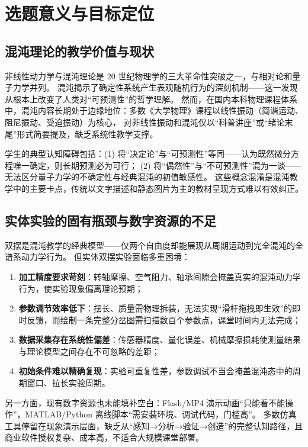 \section{选题意义与目标定位}

\subsection{混沌理论的教学价值与现状}

非线性动力学与混沌理论是 20 世纪物理学的三大革命性突破之一，与相对论和量子力学并列。
混沌揭示了确定性系统产生表观随机行为的深刻机制——这一发现从根本上改变了人类对“可预测性”的哲学理解。
然而，在国内本科物理课程体系中，混沌内容长期处于边缘地位：多数《大学物理》课程以线性振动（简谐运动、阻尼振动、受迫振动）为核心，
对非线性振动和混沌仅以“科普讲座”或“绪论末尾”形式简要提及，缺乏系统性教学支撑。

学生的典型认知障碍包括：(1) 将“决定论”与“可预测性”等同——认为既然微分方程唯一确定，则长期预测必为可行；
(2) 将“偶然性”与“不可预测性”混为一谈——无法区分量子力学的不确定性与经典混沌的初值敏感性。
这些概念混淆是混沌教学中的主要卡点，传统以文字描述和静态图片为主的教材呈现方式难以有效纠正。

\subsection{实体实验的固有瓶颈与数字资源的不足}

双摆是混沌教学的经典模型——仅两个自由度却能展现从周期运动到完全混沌的全谱系动力学行为。
但实体双摆实验面临多重困境：

\begin{enumerate}[label=(\arabic*), leftmargin=*]
  \item \textbf{加工精度要求苛刻}：转轴摩擦、空气阻力、轴承间隙会掩盖真实的混沌动力学行为，使实验现象偏离理论预期；
  \item \textbf{参数调节效率低下}：摆长、质量需物理拆装，无法实现“滑杆拖拽即生效”的即时反馈，而绘制一条完整分岔图需扫描数百个参数点，课堂时间内无法完成；
  \item \textbf{数据采集存在系统性偏差}：传感器精度、量化误差、机械摩擦损耗使测量结果与理论模型之间存在不可忽略的差距；
  \item \textbf{初始条件难以精确复现}：实验可重复性差，参数调试不当会掩盖混沌态中的周期窗口、拉长实验周期。
\end{enumerate}

另一方面，现有数字资源也未能填补空白：Flash/MP4 演示动画“只能看不能操作”，MATLAB/Python 离线脚本“需安装环境、调试代码，门槛高”。
多数仿真工具停留在现象演示层面，缺乏从“感知→分析→验证→创造”的完整认知路径，且商业软件授权复杂、成本高，不适合大规模课堂部署。

